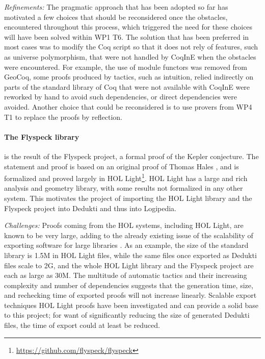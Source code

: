 \emph{Refinements:}
The pragmatic approach that has been adopted so far has motivated a
few choices that should be reconsidered once the obstacles,
encountered throughout this process, which triggered the need for
these choices will have been solved within WP1 T6. The solution that
has been preferred in most cases was to modify the Coq script so that
it does not rely of features, such as universe polymorphism, that were
not handled by CoqInE when the obstacles were encountered. For
example, the use of module functors was removed from GeoCoq, some
proofs produced by tactics, such as intuition, relied indirectly on
parts of the standard library of Coq that were not available with
CoqInE were reworked by hand to avoid such dependencies, or direct
dependencies were avoided. Another choice that could be reconsidered
is to use provers from WP4 T1 to replace the proofs by reflection.

\paragraph*{The Flyspeck library} is the result of the Flyspeck
project, a formal proof of the Kepler conjecture. The statement and
proof is based on an original proof of Thomas Hales
\cite{DBLP:journals/corr/HalesABDHHKMMNNNOPRSTTTUVZ15}, and is
formalized and proved largely in HOL
Light\footnote{\url{https://github.com/flyspeck/flyspeck}}. HOL Light
has a large and rich analysis and geometry library, with some results
not formalized in any other system. This motivates the project of
importing the HOL Light library and the Flyspeck project into
Dedukti and thus into Logipedia.

\emph{Challenges:}
Proofs coming from the HOL systems, including {HOL Light}, are known to
be very large, adding to the already existing issue of the scalability of
exporting software for large libraries
\cite{DBLP:conf/tphol/Wong95,DBLP:conf/cade/ObuaS06,DBLP:conf/itp/KellerW10,
DBLP:conf/cade/Kumar13}. As an example, the size of the standard library is
1.5M in {HOL Light} files, while the same files once
exported as {Dedukti} files scale to 2G, and the whole
{HOL Light} library and the {Flyspeck} project are each as
large as 30M. The multitude of automatic tactics and their increasing
complexity and number of dependencies suggests that the generation time, size,
and rechecking time of exported proofs will not increase linearly. Scalable
export techniques {HOL Light} proofs have been investigated
\cite{KaliszykK13} and can provide a solid base to
this project; for want of significantly reducing the size of generated
{Dedukti} files, the time of export could at least be reduced.

